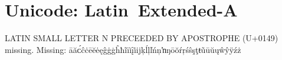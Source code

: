 

\presection\section*{\checkno Unicode: Latin~Extended-A}\postsection

 LATIN SMALL LETTER N PRECEEDED BY APOSTROPHE (U+0149) missing.
\hfill Missing: āăᴄ́ĉċēĕėęĝġģĥħĩīĭįi̇ijķĺļľńņŉŋōŏŕŗśŝşţŧũūŭųŵŷÿźż